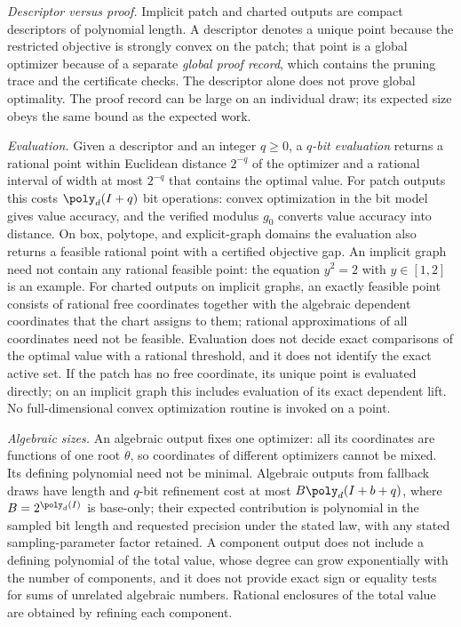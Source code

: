 \emph{Descriptor versus proof.} Implicit patch and charted outputs are
compact descriptors of polynomial length. A descriptor denotes a unique
point because the restricted objective is strongly convex on the patch;
that point is a global optimizer because of a separate \emph{global proof
record}, which contains the pruning trace and the certificate checks. The
descriptor alone does not prove global optimality. The proof record can be
large on an individual draw; its expected size obeys the same bound as the
expected work.

\emph{Evaluation.} Given a descriptor and an integer $q\ge0$, a
\emph{$q$-bit evaluation} returns a rational point within Euclidean distance $2^{-q}$
of the optimizer and a rational interval of width at most $2^{-q}$ that
contains the optimal value. For patch outputs this costs $\poly_d(I+q)$ bit
operations: convex optimization in the bit model gives value accuracy, and
the verified modulus $g_0$ converts value accuracy into distance. On box,
polytope, and explicit-graph domains the evaluation also returns a feasible
rational point with a certified objective gap. An implicit graph need not
contain any rational feasible point: the equation $y^2=2$ with $y\in[1,2]$
is an example. For charted outputs on implicit graphs, an exactly feasible
point consists of rational free coordinates together with the algebraic
dependent coordinates that the chart assigns to them; rational
approximations of all coordinates need not be feasible. Evaluation does not
decide exact comparisons of the optimal value with a rational threshold,
and it does not identify the exact active set.
If the patch has no free coordinate, its unique point is evaluated directly;
on an implicit graph this includes evaluation of its exact dependent lift.
No full-dimensional convex optimization routine is invoked on a point.

\emph{Algebraic sizes.} An algebraic output fixes one optimizer: all its
coordinates are functions of one root $\theta$, so coordinates of different
optimizers cannot be mixed. Its defining polynomial need not be minimal.
Algebraic outputs from fallback draws have length and $q$-bit refinement cost
at most $B\poly_d(I+b+q)$, where $B=2^{\poly_d(I)}$ is base-only; their
expected contribution is polynomial in the sampled bit length and requested
precision under the stated law, with any stated sampling-parameter factor
retained. A component output does not include a
defining polynomial of the total value, whose degree can grow exponentially
with the number of components, and it does not provide exact sign or
equality tests for sums of unrelated algebraic numbers. Rational
enclosures of the total value are obtained by refining each component.

